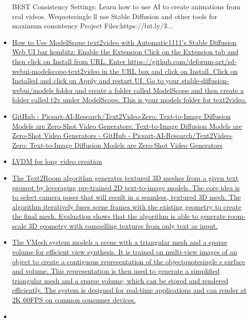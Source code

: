 \begin{itemize}
{  BEST Consistency Settings: Learn how to use AI to create animations
  from real videos. Wequotesingle ll use Stable Diffusion and other
  tools for maximum consistency Project Files:https://bit.ly/3...}
\item
  \href{https://www.kombitz.com/2023/03/28/how-to-use-modelscope-text2video-with-automatic1111s-stable-diffusion-web-ui/}{How
  to Use ModelScope text2video with Automatic1111's Stable Diffusion Web
  UI bar{} kombitz: Enable the Extension Click on the Extension tab
  and then click on Install from URL. Enter
  https://github.com/deforum-art/sd-webui-modelscope-text2video in the
  URL box and click on Install. Click on Installed and click on Apply
  and restart UI. Go to your stable-diffusion-webui/models folder and
  create a folder called ModelScope and then create a folder called t2v
  under ModelScope. This is your models folder for text2video.}
\item
  \href{https://github.com/Picsart-AI-Research/Text2Video-Zero}{GitHub -
  Picsart-AI-Research/Text2Video-Zero: Text-to-Image Diffusion Models
  are Zero-Shot Video Generators: Text-to-Image Diffusion Models are
  Zero-Shot Video Generators - GitHub -
  Picsart-AI-Research/Text2Video-Zero: Text-to-Image Diffusion Models
  are Zero-Shot Video Generators}
\item
  \href{https://yingqinghe.github.io/LVDM/}{LVDM for long video
  creation}
\item
  \href{https://lukashoel.github.io/text-to-room/}{The Text2Room
  algorithm generates textured 3D meshes from a given text prompt by
  leveraging pre-trained 2D text-to-image models. The core idea is to
  select camera poses that will result in a seamless, textured 3D mesh.
  The algorithm iteratively fuses scene frames with the existing
  geometry to create the final mesh. Evaluation shows that the algorithm
  is able to generate room-scale 3D geometry with compelling textures
  from only text as input.}
\item
  \href{https://bennyguo.github.io/vmesh/}{The VMesh system models a
  scene with a triangular mesh and a sparse volume for efficient view
  synthesis. It is trained on multi-view images of an object to create a
  contiguous representation of the objectquotesingle s surface and
  volume. This representation is then used to generate a simplified
  triangular mesh and a sparse volume, which can be stored and rendered
  efficiently. The system is designed for real-time applications and can
  render at 2K 60FPS on common consumer devices.}
\item

\end{itemize}
